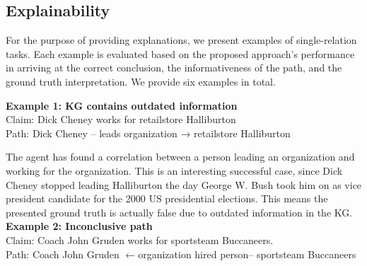 \subsection{Explainability}

\label{explain}

For the purpose of providing explanations, we present examples of single-relation tasks. %
 Each example is evaluated based on the proposed approach's performance in arriving at the correct conclusion, the informativeness of the path, and the ground truth interpretation. We provide six examples in total.


\noindent\textbf{Example 1: KG contains outdated information}
\\Claim: Dick Cheney works for retailstore Halliburton
\\Path: Dick Cheney – leads organization → retailstore Halliburton

\noindent The agent has found a correlation between a person leading an organization and working for the organization. This is an interesting successful case, since Dick Cheney stopped leading Halliburton the day George W. Bush took him on as vice president candidate for the 2000 US presidential elections. This means the presented ground truth is actually false due to outdated information in the KG. %
\newline
\noindent\textbf{Example 2: Inconclusive path}
\\Claim:	Coach John Gruden works for sportsteam Buccaneers.
\\Path:	Coach John Gruden $\leftarrow$organization hired person– sportsteam Buccaneers

